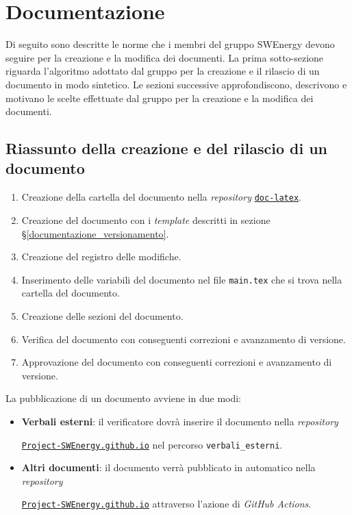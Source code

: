 \section{Documentazione}

Di seguito sono descritte le norme che i membri del gruppo SWEnergy devono
seguire per la creazione e la modifica dei documenti. La prima sotto-sezione
riguarda l'algoritmo adottato dal gruppo per la creazione e il rilascio di un
documento in modo sintetico. Le sezioni successive approfondiscono, descrivono
e motivano le scelte effettuate dal gruppo per la creazione e la modifica dei
documenti.

\subsection{Riassunto della creazione e del rilascio di un documento}

\begin{enumerate}
	\item Creazione della cartella del documento nella \textit{repository}
	      \href{https://github.com/Project-SWEnergy/doc-latex}{\texttt{doc-latex}}.
	\item Creazione del documento con i \textit{template} descritti in
	      sezione \S\ref{documentazione_versionamento}.
	\item Creazione del registro delle modifiche.
	\item Inserimento delle variabili del documento nel file
	      \texttt{main.tex} che si trova nella cartella del documento.
	\item Creazione delle sezioni del documento.
	\item Verifica del documento con conseguenti correzioni e avanzamento di
	      versione.
	\item Approvazione del documento con conseguenti correzioni e avanzamento
	      di versione.
\end{enumerate}

La pubblicazione di un documento avviene in due modi:
\begin{itemize}
	\item \textbf{Verbali esterni}: il verificatore dovrà inserire il documento
	      nella \textit{repository}
	      \begin{sloppypar}
		      \href{https://github.com/Project-SWEnergy/Project-SWEnergy.github.io}{\texttt{Project-SWEnergy.github.io}}
		      nel percorso \texttt{verbali\_esterni}.
	      \end{sloppypar}
	\item \textbf{Altri documenti}: il documento verrà pubblicato in automatico
	      nella \textit{repository}
	      \begin{sloppypar}
		      \href{https://github.com/Project-SWEnergy/Project-SWEnergy.github.io}{\texttt{Project-SWEnergy.github.io}}
		      attraverso l'azione di \textit{GitHub Actions}.
	      \end{sloppypar}
\end{itemize}


